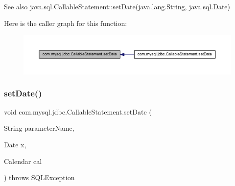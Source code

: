 \begin{DoxySeeAlso}{See also}
java.\+sql.\+Callable\+Statement\+::set\+Date(java.\+lang.\+String, java.\+sql.\+Date) 
\end{DoxySeeAlso}
Here is the caller graph for this function\+:\nopagebreak
\begin{figure}[H]
\begin{center}
\leavevmode
\includegraphics[width=350pt]{classcom_1_1mysql_1_1jdbc_1_1_callable_statement_a9b7fdf2a24d93e82360a75ec55f799f6_icgraph}
\end{center}
\end{figure}
\mbox{\label{classcom_1_1mysql_1_1jdbc_1_1_callable_statement_a18837a9d186c198eebc30d04fa684679}} 
\subsubsection{\texorpdfstring{set\+Date()}{setDate()}\hspace{0.1cm}{\footnotesize\ttfamily [2/2]}}
{\footnotesize\ttfamily void com.\+mysql.\+jdbc.\+Callable\+Statement.\+set\+Date (\begin{DoxyParamCaption}\item[{String}]{parameter\+Name,  }\item[{Date}]{x,  }\item[{Calendar}]{cal }\end{DoxyParamCaption}) throws S\+Q\+L\+Exception}

